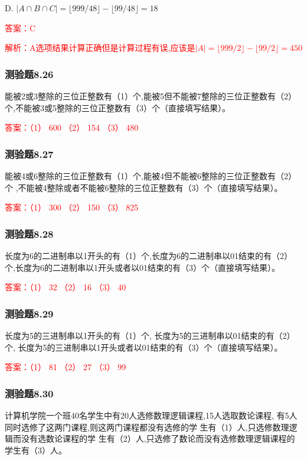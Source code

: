 \documentclass[UTF8, heading=true]{ctexart}
\begin{document}
D. $|A \cap B \cap C|=\lfloor 999 / 48\rfloor-\lfloor 99 / 48\rfloor=18$

\textcolor{red}{答案：C}

\textcolor{red}{解析：A选项结果计算正确但是计算过程有误,应该是$|A|=\lfloor 999 / 2\rfloor - \lfloor 99 / 2\rfloor=450$}

\subsubsection{测验题8.26}


能被2或3整除的三位正整数有（1）个,能被5但不能被7整除的三位正整数有（2）个,不能被3或5整除的三位正整数有（3）个（直接填写结果）。

\textcolor{red}{答案：（1） 600 （2） 154 （3） 480}

\subsubsection{测验题8.27}
能被4或6整除的三位正整数有（1）个,能被4但不能被6整除的三位正整数有（2）个
,不能被4整除或者不能被6整除的三位正整数有（3）个（直接填写结果）。

\textcolor{red}{答案：（1） 300 （2） 150 （3） 825}

\subsubsection{测验题8.28}

长度为6的二进制串以1开头的有（1）个,长度为6的二进制串以01结束的有（2）个,长度为6的二进制串以1开头或者以01结束的有（3）个（直接填写结果）。

\textcolor{red}{答案：（1） 32 （2） 16 （3） 40}

\subsubsection{测验题8.29}

长度为5的三进制串以1开头的有（1）个,
长度为5的三进制串以01结束的有（2）个,
长度为5的三进制串以1开头或者以01结束的有（3）个（直接填写结果）。

\textcolor{red}{答案：（1） 81 （2） 27 （3） 99}

\subsubsection{测验题8.30}

计算机学院一个班40名学生中有20人选修数理逻辑课程,15人选取数论课程,
有5人同时选修了这两门课程,则这两门课程都没有选修的学
生有（1）人,只选修数理逻辑而没有选数论课程的学
生有（2）人,只选修了数论而没有选修数理逻辑课程的学生有（3）人。
\end{document}
